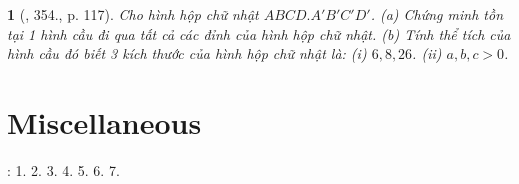 \documentclass{article}
\newtheorem{baitoan}{}
\begin{document}
\begin{baitoan}[\cite{Binh_Toan_9_tap_2}, 354., p. 117]
	Cho hình hộp chữ nhật $ABCD.A'B'C'D'$. (a) Chứng minh tồn tại 1 hình cầu đi qua tất cả các đỉnh của hình hộp chữ nhật. (b) Tính thể tích của hình cầu đó biết 3 kích thước của hình hộp chữ nhật là: (i) $6,8,26$. (ii) $a,b,c > 0$.
\end{baitoan}


\section{Miscellaneous}
\cite[BTCCX, pp. 109--110]{SGK_Toan_9_Canh_Dieu_tap_1}: 1. 2. 3. 4. 5. 6. 7.


\printbibliography[heading=bibintoc]
	
\end{document}
